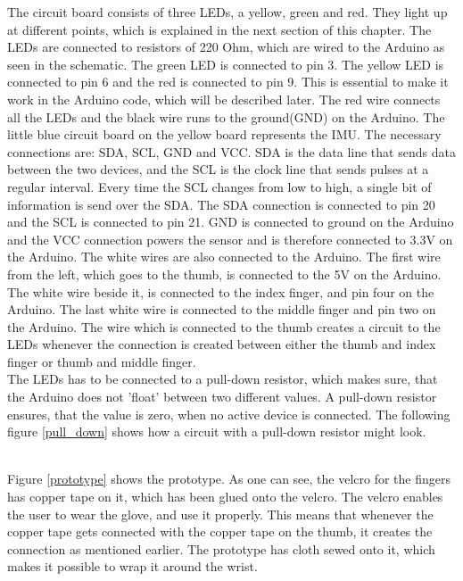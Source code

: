 The circuit board consists of three LEDs, a yellow, green and red. They light up at different points, which is explained in the next section of this chapter.
The LEDs are connected to resistors of 220 Ohm, which are wired to the Arduino as seen in the schematic. The green LED is connected to pin 3. 
The yellow LED is connected to pin 6 and the red is connected to pin 9. This is essential to make it work in the Arduino code, which will be described later. 
The red wire connects all the LEDs and the black wire runs to the ground(GND) on the Arduino. The little blue circuit board on the yellow board represents the IMU. The necessary connections are: SDA, SCL, GND and VCC. 
SDA is the data line that sends data between the two devices, and the SCL is the clock line that sends pulses at a regular interval\citep{Arduino_SDA}. Every time the SCL changes from low to high, a single bit of information is send over the SDA.
The SDA connection is connected to pin 20 and the SCL is connected to pin 21. GND is connected to ground on the Arduino and the VCC connection powers the sensor and is therefore connected to 3.3V on the Arduino. The white wires are also connected to the Arduino. The first wire from the left, which goes to the thumb, is connected to the 5V on the Arduino. 
The white wire beside it, is connected to the index finger, and pin four on the Arduino. The last white wire is connected to the middle finger and pin two on the Arduino.
The wire which is connected to the thumb creates a circuit to the LEDs whenever the connection is created between either the thumb and index finger or thumb and middle finger. \\


The LEDs has to be connected to a pull-down resistor\citep{Pulldown_res}, which makes sure, that the Arduino does not 'float' between two different values. A pull-down resistor ensures, that the value is zero, when no active device is connected.
The following figure \ref{pull_down} shows how a circuit with a pull-down resistor might look. \\


\begin{minipage}{\linewidth}%
\label{pull_down}
\end{minipage}\\

Figure \ref{prototype} shows the prototype. As one can see, the velcro for the fingers has copper tape on it, which has been glued onto the velcro. The velcro enables the user to wear the glove, and use it properly.  
This means that whenever the copper tape gets connected with the copper tape on the thumb, it creates the connection as mentioned earlier. 
The prototype has cloth sewed onto it, which makes it possible to wrap it around the wrist. \\

